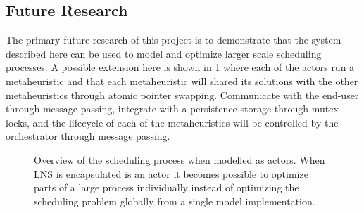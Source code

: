 \begin{figure}[H]
	
\end{figure}

\subsection{Future Research}
The primary future research of this project is to demonstrate that the system described here can be 
used to model and optimize larger scale scheduling processes. A possible extension here is shown in
\ref{fig:ordinator-architecture} where each of 
the actors run a metaheuristic and that each metaheuristic will shared its solutions with the 
other metaheuristics through atomic pointer swapping. Communicate with the end-user through message
passing, integrate with a persistence storage through mutex locks, and the lifecycle of each of the 
metaheuristics will be controlled by the orchestrator through message passing.

\begin{figure}[H]
	\centering
	
	\caption{
		Overview of the scheduling process when modelled as actors. When LNS is encapsulated 
		is an actor it becomes possible to optimize parts of a large process individually instead of 
		optimizing the scheduling problem globally from a single model implementation.
	}
	\label{fig:ordinator-architecture}
\end{figure}

